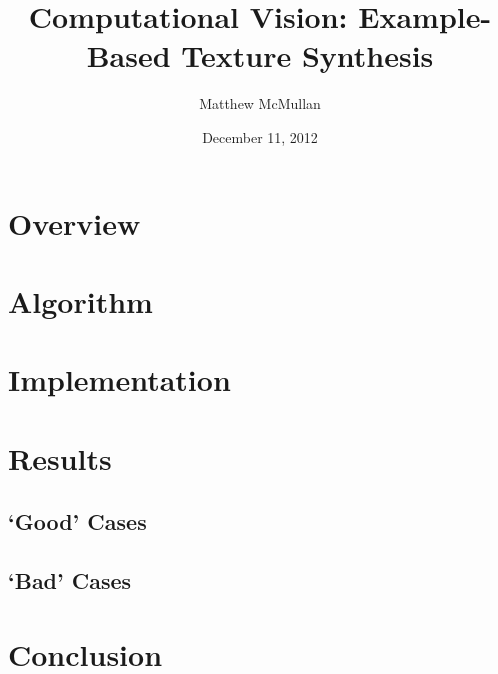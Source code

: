 \documentclass[12pt]{article}
\title{Computational Vision: Example-Based Texture Synthesis}
\author{Matthew McMullan}
\date{December 11, 2012}
\begin{document}
    \maketitle
    \section{Overview}
    \section{Algorithm}
    \section{Implementation}
    \section{Results}
        \subsection{`Good' Cases}
        \subsection{`Bad' Cases}
    \section{Conclusion}
\end{document}
